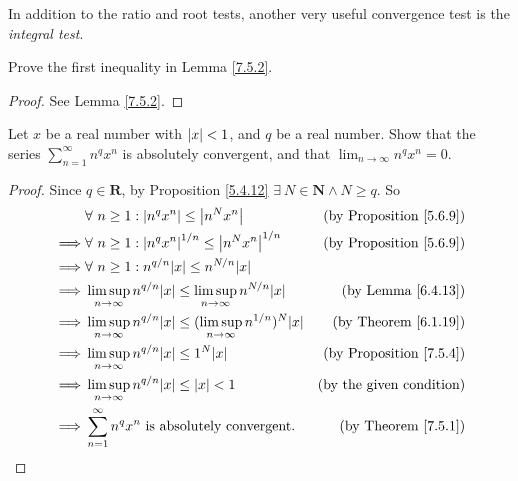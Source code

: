 \begin{remark}\label{7.5.5}
    In addition to the ratio and root tests, another very useful convergence test is the \emph{integral test}.
\end{remark}

\exercisesection

\begin{exercise}\label{ex 7.5.1}
    Prove the first inequality in Lemma \ref{7.5.2}.
\end{exercise}

\begin{proof}
    See Lemma \ref{7.5.2}.
\end{proof}

\begin{exercise}\label{ex 7.5.2}
    Let \(x\) be a real number with \(\abs*{x} < 1\), and \(q\) be a real number.
    Show that the series \(\sum_{n = 1}^\infty n^q x^n\) is absolutely convergent, and that \(\lim_{n \to \infty} n^q x^n = 0\).
\end{exercise}

\begin{proof}
    Since \(q \in \mathbf{R}\), by Proposition \ref{5.4.12} \(\exists\ N \in \mathbf{N} \land N \geq q\).
    So
    \begin{align*}
                 & \forall\ n \geq 1 : \abs*{n^q x^n} \leq \abs*{n^N x^n}                                       & \text{(by Proposition \ref{5.6.9})} \\
        \implies & \forall\ n \geq 1 : \abs*{n^q x^n}^{1 / n} \leq \abs*{n^N x^n}^{1 / n}                       & \text{(by Proposition \ref{5.6.9})} \\
        \implies & \forall\ n \geq 1 : n^{q / n} \abs*{x} \leq n^{N / n} \abs*{x}                                                                     \\
        \implies & \limsup_{n \to \infty} n^{q / n} \abs*{x} \leq \limsup_{n \to \infty} n^{N / n} \abs*{x}     & \text{(by Lemma \ref{6.4.13})}      \\
        \implies & \limsup_{n \to \infty} n^{q / n} \abs*{x} \leq (\limsup_{n \to \infty} n^{1 / n})^N \abs*{x} & \text{(by Theorem \ref{6.1.19})}    \\
        \implies & \limsup_{n \to \infty} n^{q / n} \abs*{x} \leq 1^N \abs*{x}                                  & \text{(by Proposition \ref{7.5.4})} \\
        \implies & \limsup_{n \to \infty} n^{q / n} \abs*{x} \leq \abs*{x} < 1                                  & \text{(by the given condition)}     \\
        \implies & \sum_{n = 1}^\infty n^q x^n \text{ is absolutely convergent}.                                & \text{(by Theorem \ref{7.5.1})}
    \end{align*}
\end{proof}

